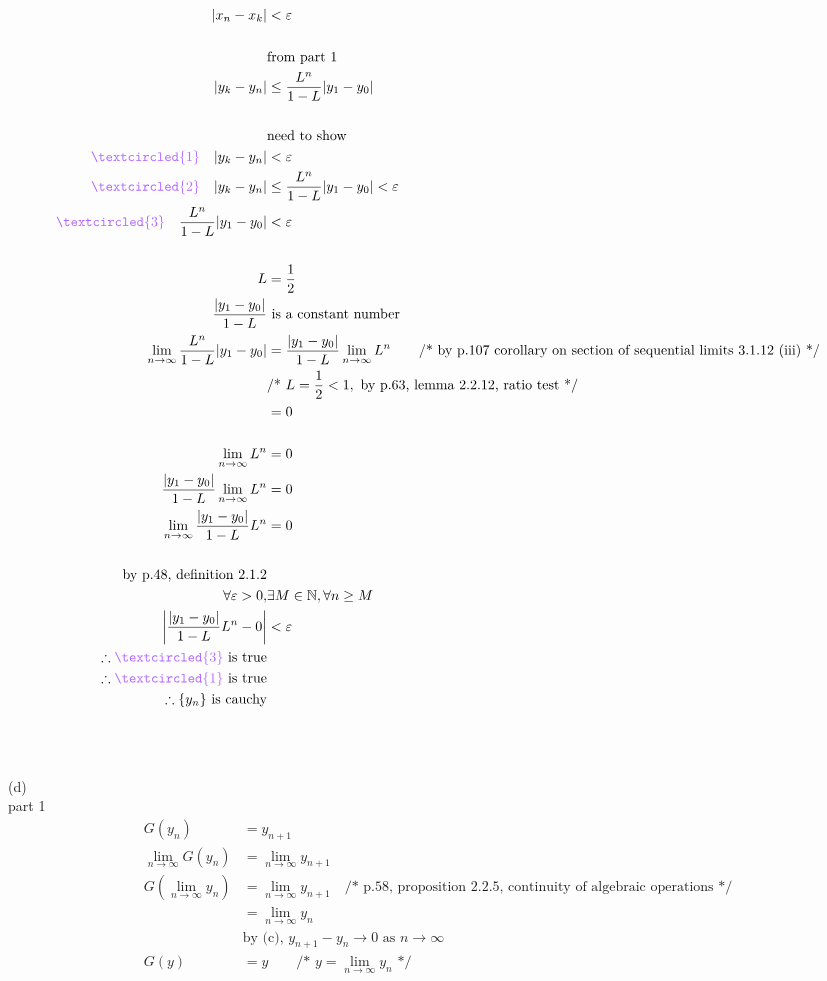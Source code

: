\documentclass[12pt, border = 4pt, multi]{article} %
\begin{document}
\begin{align*}
|x_n - x_k| &< \varepsilon\\
\\
&\text{from part 1}\\
|y_k - y_n| &\leq \frac{L ^ n}{1 - L}|y_1 - y_0|\\
\\
&\text{need to show}\\
\textcolor{orchid}{\textcircled{1}}\quad|y_k - y_n| &< \varepsilon\\
\textcolor{orchid}{\textcircled{2}}\quad|y_k - y_n| &\leq \frac{L ^ n}{1 - L}|y_1 - y_0| < \varepsilon\\
\textcolor{orchid}{\textcircled{3}}\quad\frac{L ^ n}{1 - L}|y_1 - y_0| &< \varepsilon\\
\\
L &= \frac{1}{2}\\
\frac{|y_1 - y_0|}{1 - L} &\text{ is a constant number}\\
\lim_{n \rightarrow \infty} \frac{L ^ n}{1 - L}|y_1 - y_0| &= \frac{|y_1 - y_0|}{1 - L}\lim_{n \rightarrow \infty} L ^ n \qquad \text{/* by p.107 corollary on section of sequential limits 3.1.12 (iii) */}\\
&\text{/* } L = \frac{1}{2} < 1, \text{ by p.63, lemma 2.2.12, ratio test */}\\
&= 0\\
\\
\lim_{n \rightarrow \infty} L ^ n &= 0\\
\frac{|y_1 - y_0|}{1 - L}\lim_{n \rightarrow \infty} L ^ n &= 0\\
\lim_{n \rightarrow \infty} \frac{|y_1 - y_0|}{1 - L} L ^ n &= 0\\
\\
\text{by p.48, definition 2.1.2}\\
\forall \varepsilon > 0, &\exists M \in \mathbb{N}, \forall n \geq M\\
\left|\frac{|y_1 - y_0|}{1 - L} L ^ n - 0\right| &< \varepsilon\\
\therefore \textcolor{orchid}{\textcircled{3}} \text{ is true}\\
\therefore \textcolor{orchid}{\textcircled{1}} \text{ is true}\\
\therefore \{y_n\}\text{ is cauchy}
\end{align*}
\\
\\
\\
(d)\\
part 1
\begin{align*} 
G(y_n) &= y_{n + 1}\\
\lim_{n \rightarrow \infty} G(y_n) &= \lim_{n \rightarrow \infty} y_{n + 1}\\
G(\lim_{n \rightarrow \infty} y_n) &= \lim_{n \rightarrow \infty} y_{n + 1}\quad \text{/* p.58, proposition 2.2.5, continuity of algebraic operations */}\\
&= \lim_{n \rightarrow \infty} y_n\\
&\text{by (c), } y_{n + 1} - y_n \rightarrow 0 \text{ as } n \rightarrow \infty\\
G(y) &= y \qquad \text{/* } y = \lim_{n \rightarrow \infty} y_n \text{ */}
\end{align*}
\end{document}
